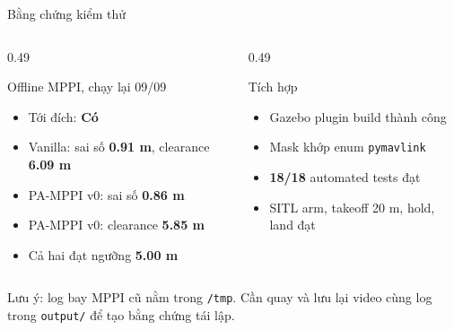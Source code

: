 \documentclass[aspectratio=169,11pt]{beamer}
\begin{document}
\begin{frame}{Bằng chứng kiểm thử}
  \begin{columns}[T,onlytextwidth]
    \begin{column}{0.49\textwidth}
      \begin{block}{Offline MPPI, chạy lại 09/09}
        \begin{itemize}
          \item Tới đích: \textbf{Có}
          \item Vanilla: sai số \textbf{0.91 m}, clearance \textbf{6.09 m}
          \item PA-MPPI v0: sai số \textbf{0.86 m}
          \item PA-MPPI v0: clearance \textbf{5.85 m}
          \item Cả hai đạt ngưỡng \textbf{5.00 m}
        \end{itemize}
      \end{block}
    \end{column}
    \begin{column}{0.49\textwidth}
      \begin{block}{Tích hợp}
        \begin{itemize}
          \item Gazebo plugin build thành công
          \item Mask khớp enum \texttt{pymavlink}
          \item \textbf{18/18} automated tests đạt
          \item SITL arm, takeoff 20 m, hold, land đạt
        \end{itemize}
      \end{block}
    \end{column}
  \end{columns}

  \vspace{0.5em}
  \alert{Lưu ý:} log bay MPPI cũ nằm trong \texttt{/tmp}. Cần quay và lưu lại
  video cùng log trong \texttt{output/} để tạo bằng chứng tái lập.
\end{frame}
\end{document}
